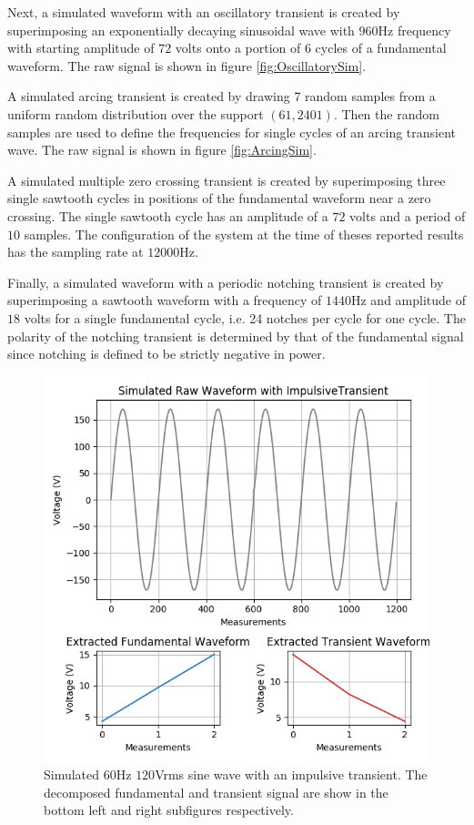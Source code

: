 \documentclass[10pt,conference,compsocconf]{IEEEtran}
\begin{document}
Next, a simulated waveform with an oscillatory transient is created by superimposing an exponentially decaying sinusoidal wave with $960$Hz frequency with starting amplitude of $72$ volts onto a portion of $6$ cycles of a fundamental waveform. The raw signal is shown in figure \ref{fig:OscillatorySim}.

A simulated arcing transient is created by drawing 7 random samples from a uniform random distribution over the support $(61, 2401)$. Then the random samples are used to define the frequencies for single cycles of an arcing transient wave. The raw signal is shown in figure \ref{fig:ArcingSim}.

A simulated multiple zero crossing transient is created by superimposing three single sawtooth cycles in positions of the fundamental waveform near a zero crossing. The single sawtooth cycle has an amplitude of a $72$ volts and a period of $10$ samples. The configuration of the system at the time of theses reported results has the sampling rate at $12000$Hz. 

Finally, a simulated waveform with a periodic notching transient is created by superimposing a sawtooth waveform with a frequency of $1440$Hz and amplitude of $18$ volts for a single fundamental cycle, i.e. 24 notches per cycle for one cycle. The polarity of the notching transient is determined by that of the fundamental signal since notching is defined to be strictly negative in power.

\begin{figure}[htbp]
\centering%
\includegraphics[scale=0.35]{./figures/impulsive_sim.png}
\caption{Simulated $60$Hz $120$Vrms sine wave with an impulsive transient. The decomposed fundamental and transient signal are show in the bottom left and right subfigures respectively.}\label{fig:ImpulsiveSim}
\end{figure}
\end{document}
